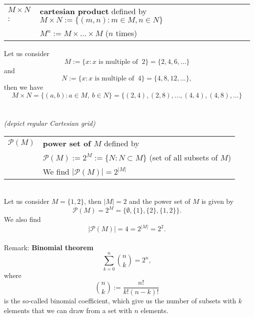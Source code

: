 \begin{frame}
	\begin{table}[h] \color{defgruen}
		\begin{tabular}[t]{ll}
			$M \times N$: & \textbf{cartesian product} defined by 
			$M \times N :=\{(m,n)\colon m\in M,n\in N  \}$\vspace{0.2cm}\\\vspace{0.4cm}
			& $M^n := M \times \ldots \times M$ ($n$ times)
		\end{tabular}
	\end{table}
{
	\blank
Let us consider $$M:=\{ x : \text{$x$ is multiple of } ~2 \} = \{2, 4, 6, \ldots\}$$ and 
$$N:=\{ x : \text{$x$ is multiple of } ~4 \} = \{4, 8, 12, \ldots\},$$ then we have\\ 
$$M \times N = \{(a,b): a\in M, ~b\in N\} = \{ (2,4), (2,8),\ldots, (4,4), (4,8), \ldots \}$$ \\~\\
\textit{(depict regular Cartesian grid)}
}
\end{frame}

\begin{frame}
\begin{table}[h] \color{defgruen}
	\begin{tabular}[t]{ll}
	$\mathcal{P} (M)$  & \textbf{power set of $M$} defined by\\
	&$\mathcal{P} (M) := 2^M :=\{ N: N\subset M\} $ (set of all subsets of $M$)\\
	&\vspace{0.2cm}We find $|\mathcal{P} (M)| = 2^{|M|}$
\end{tabular}
\end{table}
{
	\blank~\\

 Let us consider $M=\{ 1,2\}$, then $|M|=2$ and the power set of $M$ is given by
	\[\mathcal{P}(M)=2^M=\bigl\{\emptyset ,\{ 1\},\{ 2\},\{ 1,2\}\bigr\}.\]
	We also find
	$$|\mathcal{P}(M)|=4 = 2^{|M|}=2^2 . $$
	~\\
	Remark: \textbf{Binomial theorem}
	$$ \sum_{k=0}^n 	\binom{n}{k} =2^n,  $$
	where $$\binom{n}{k} := \frac{n!}{k!(n-k)!}$$ is the so-called binomial coefficient, which give us the number of subsets with $k$ elements that we can draw from a set with $n$ elements.

}
\end{frame}



